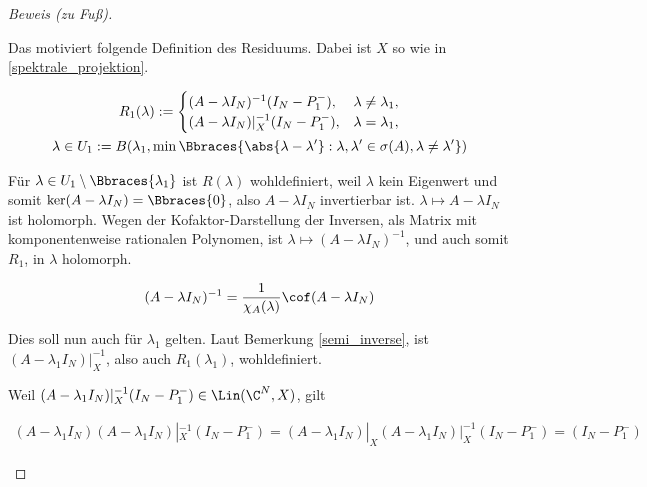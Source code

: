 \begin{proof}[Beweis (zu Fuß)]
\begin{enumerate}[label = (\roman*)]
        Das motiviert folgende Definition des Residuums.
        Dabei ist $X$ so wie in \ref{spektrale_projektion}.

        \begin{multline*}
            R_1(\lambda)
            :=
            \begin{cases}
                (A - \lambda I_N)    ^{-1} (I_N - P_1^-), & \lambda \neq \lambda_1, \\
                (A - \lambda I_N) |_X^{-1} (I_N - P_1^-), & \lambda =    \lambda_1, \\
            \end{cases} \\
            \lambda
            \in
            U_1
            :=
            B
            (
                \lambda_1,
                \min
                \Bbraces
                {
                    \abs{\lambda - \lambda^\prime}:
                    \lambda, \lambda^\prime \in \sigma(A),
                    \lambda \neq \lambda^\prime
                }
            )
        \end{multline*}

        Für $\lambda \in U_1 \setminus \Bbraces{\lambda_1}$ ist $R(\lambda)$ wohldefiniert, weil $\lambda$ kein Eigenwert und somit $\ker (A - \lambda I_N) = \Bbraces{0}$, also $A - \lambda I_N$ invertierbar ist.
        $\lambda \mapsto A - \lambda I_N$ ist holomorph.
        Wegen der Kofaktor-Darstellung der Inversen, als Matrix mit komponentenweise rationalen Polynomen, ist $\lambda \mapsto (A - \lambda I_N)^{-1}$, und auch somit $R_1$, in $\lambda$ holomorph.

        \begin{align*}
            (A - \lambda I_N)^{-1}
            =
            \frac{1}{\chi_A(\lambda)}
            \cof (A - \lambda I_N)
        \end{align*}

        Dies soll nun auch für $\lambda_1$ gelten.
        Laut Bemerkung \ref{semi_inverse}, ist $(A - \lambda_1 I_N) |_X^{-1}$, also auch $R_1(\lambda_1)$, wohldefiniert.

        Weil $(A - \lambda_1 I_N) |_X^{-1} (I_N - P_1^-) \in \Lin(\C^N, X)$, gilt

        \begin{align*}
            (A - \lambda_1 I_N)
            (A - \lambda_1 I_N) |_X^{-1}
            (I_N - P_1^-)
            =
            (A - \lambda_1 I_N) |_X
            (A - \lambda_1 I_N) |_X^{-1}
            (I_N - P_1^-)
            =
            (I_N - P_1^-)
        \end{align*}


\end{enumerate}
\end{proof}
